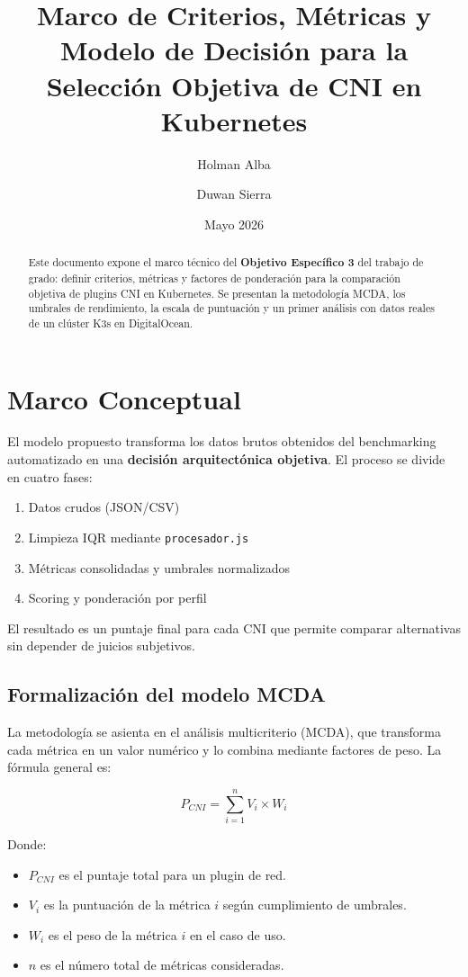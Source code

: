 \documentclass[12pt,a4paper]{article}
\title{Marco de Criterios, Métricas y Modelo de Decisión para la Selección Objetiva de CNI en Kubernetes}
\author{Holman Alba \and Duwan Sierra}
\date{Mayo 2026}
\begin{document}
\maketitle

\begin{abstract}
Este documento expone el marco técnico del \textbf{Objetivo Específico 3} del trabajo de grado: definir criterios, métricas y factores de ponderación para la comparación objetiva de plugins CNI en Kubernetes.
Se presentan la metodología MCDA, los umbrales de rendimiento, la escala de puntuación y un primer análisis con datos reales de un clúster K3s en DigitalOcean.
\end{abstract}

\section{Marco Conceptual}

El modelo propuesto transforma los datos brutos obtenidos del benchmarking automatizado en una \textbf{decisión arquitectónica objetiva}. El proceso se divide en cuatro fases:

\begin{enumerate}
  \item Datos crudos (JSON/CSV)
  \item Limpieza IQR mediante \texttt{procesador.js}
  \item Métricas consolidadas y umbrales normalizados
  \item Scoring y ponderación por perfil
\end{enumerate}

El resultado es un puntaje final para cada CNI que permite comparar alternativas sin depender de juicios subjetivos.

\subsection{Formalización del modelo MCDA}

La metodología se asienta en el análisis multicriterio (MCDA), que transforma cada métrica en un valor numérico y lo combina mediante factores de peso.
La fórmula general es:

\begin{equation}
P_{CNI} = \sum_{i=1}^{n} V_i \times W_i
\end{equation}

Donde:
\begin{itemize}
  \item $P_{CNI}$ es el puntaje total para un plugin de red.
  \item $V_i$ es la puntuación de la métrica $i$ según cumplimiento de umbrales.
  \item $W_i$ es el peso de la métrica $i$ en el caso de uso.
  \item $n$ es el número total de métricas consideradas.
\end{itemize}
\end{document}
